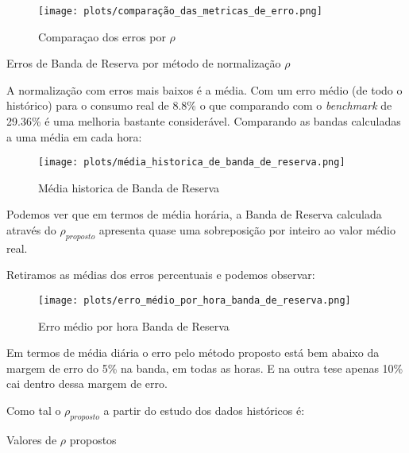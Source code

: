 \begin{figure}[H]
    \centering
    \texttt{[image: plots/comparação\_das\_metricas\_de\_erro.png]}
    \caption{Comparaçao dos erros por $\rho$}
\end{figure}


\begin{table}[H]
    \centering
    \caption{Erros de Banda de Reserva por método de normalização $\rho$}    
    \resizebox{0.65\linewidth}{!}{}
    \end{table}


A normalização com erros mais baixos é a média. Com um erro médio (de todo o histórico) para o consumo real de 8.8\% o que comparando com o \textit{benchmark} de 29.36\% é uma melhoria  bastante considerável. Comparando as bandas calculadas a uma média em cada hora:\par

\begin{figure}[H]
    \centering
    \texttt{[image: plots/média\_historica\_de\_banda\_de\_reserva.png]}
    \caption{Média historica de Banda de Reserva}
\end{figure}

Podemos ver que em termos de média horária, a Banda de Reserva calculada através do $\rho_{proposto}$ apresenta quase uma sobreposição por inteiro ao valor médio real.\par

Retiramos as médias dos erros percentuais e podemos observar: \\

\begin{figure}[H]
    \centering
    \texttt{[image: plots/erro\_médio\_por\_hora\_banda\_de\_reserva.png]}
    \caption{Erro médio por hora Banda de Reserva}
\end{figure}

Em termos de média diária o erro pelo método proposto está bem abaixo da margem de erro do 5\% na banda, em todas as horas. E na outra tese apenas 10\% cai dentro dessa margem de erro.\par

Como tal o $\rho_{proposto}$ a partir do estudo dos dados  históricos é: \

\begin{table}[H] \centering \caption{Valores de $\rho$ propostos}  \end{table}


